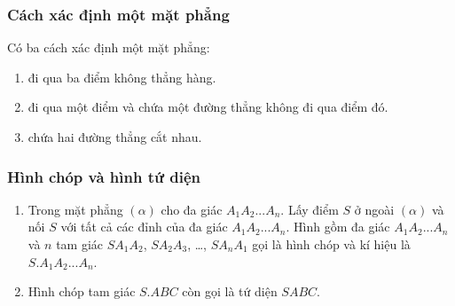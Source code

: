 	
\subsubsection{Cách xác định một mặt phẳng}
Có ba cách xác định một mặt phẳng:
\begin{enumerate}
	\item đi qua ba điểm không thẳng hàng.
	\item đi qua một điểm và chứa một đường thẳng không đi qua điểm đó.
	\item chứa hai đường thẳng cắt nhau.
	\end{enumerate}
	
\subsubsection{Hình chóp và hình tứ diện}
\begin{enumerate}
	\item Trong mặt phẳng $(\alpha)$ cho đa giác $A_1A_2...A_n$. Lấy điểm $S$ ở ngoài $(\alpha)$ và nối $S$ với tất cả các đỉnh của đa giác $A_1A_2...A_n$. Hình gồm đa giác $A_1A_2...A_n$ và $n$ tam giác $SA_1A_2$, $SA_2A_3$, \ldots, $SA_nA_1$ gọi là hình chóp và kí hiệu là $S.A_1A_2...A_n$.
	\item Hình chóp tam giác $S.ABC$ còn gọi là tứ diện $SABC$.
	\end{enumerate}



